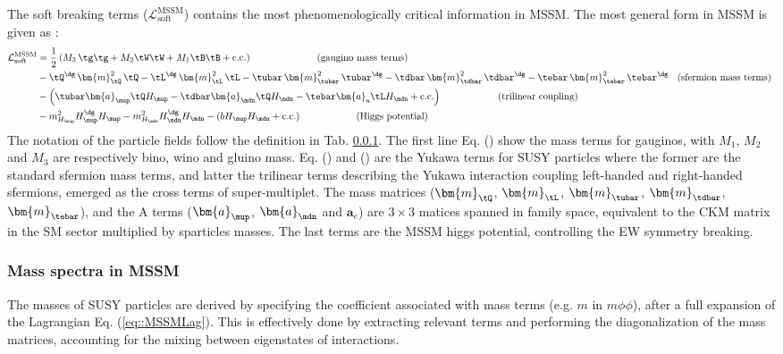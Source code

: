 The soft breaking terms ($\mathcal{L}^{\mathrm{MSSM}}_{\mathrm{soft}}$) contains the most phenomenologically critical information in MSSM. The most general form in MSSM is given as \cite{SUSYPrimer}:
%
\begin{align}
\mathcal{L}^{\mathrm{MSSM}}_{\mathrm{soft}} 
& = \frac{1}{2} \left( M_3 \, \tg\tg + M_2 \tW\tW + M_1 \tB\tB + \mathrm{c.c.}  \right)  \mbox{\phantom{MMMMMMM} (gaugino mass terms)}  \label{eq::MSSM_gauge} \\
%
& - \tQ^{\dg} \, \bm{m}_{\tQ}^2    \, \tQ 
  - \tL^{\dg} \, \bm{m}_{\tL}^2    \, \tL 
  - \tubar    \, \bm{m}_{\tubar}^2 \, \tubar^{\dg} 
  - \tdbar    \, \bm{m}_{\tdbar}^2 \, \tdbar^{\dg} 
  - \tebar    \, \bm{m}_{\tebar}^2 \, \tebar^{\dg}  \mbox{\phantom{M}(sfermion mass terms)  }  \label{eq::MSSM_sfermions} \\
%
& -  \left( 
  \tubar \bm{a}_\mup \tQ H_\mup 
- \tdbar \bm{a}_\mdn \tQ H_\mdn 
- \tebar \bm{a}_e    \tL H_\mdn 
+ \mathrm{c.c.}  \right)  \mbox{\phantom{MMMMMM} (trilinear coupling)} \label{eq::MSSM_trilinear} \\
%
& - m^2_{H_\mup} H_{\mup}^{\dg} H_\mup  
  - m^2_{H_\mdn} H_{\mdn}^{\dg} H_\mdn  
  - (b H_\mup H_\mdn + \mathrm{c.c.})   \mbox{\phantom{MMMMMM} (Higgs potential)} \label{eq::MSSM_higgs}
%
\end{align}
The notation of the particle fields follow the definition in Tab. \ref{}.
The first line Eq. (\label{eq::MSSM_gauge}) show the mass terms for gauginos, with $M_1$, $M_2$ and $M_3$ are respectively bino, wino and gluino mass. Eq. (\label{eq::MSSM_trilinear}) and (\label{eq::MSSM_sfermions}) are the Yukawa terms for SUSY particles where the former are the standard sfermion mass terms, and latter the trilinear terms describing the Yukawa interaction coupling left-handed and right-handed sfermions, emerged as the cross terms of super-multiplet. The mass matrices ($\bm{m}_{\tQ}$, $\bm{m}_{\tL}$, $\bm{m}_{\tubar}$, $\bm{m}_{\tdbar}$, $\bm{m}_{\tebar}$), and the A terms ($\bm{a}_\mup$, $\bm{a}_\mdn$ and $\bm{a}_e$) are $3\times3$ matices spanned in family space, equivalent to the CKM matrix in the SM sector multiplied by sparticles masses. The last terms \label{eq::MSSM_higgs} are the MSSM higgs potential, controlling the EW symmetry breaking. 


\subsubsection{Mass spectra in MSSM}
The masses of SUSY particles are derived by specifying the coefficient associated with mass terms (e.g. $m$ in $m\phi\phi$), after a full expansion of the Lagrangian Eq. (\ref{eq::MSSMLag}). This is effectively done by extracting relevant terms and performing the diagonalization of the mass matrices, accounting for the mixing between eigenstates of interactions. \\

